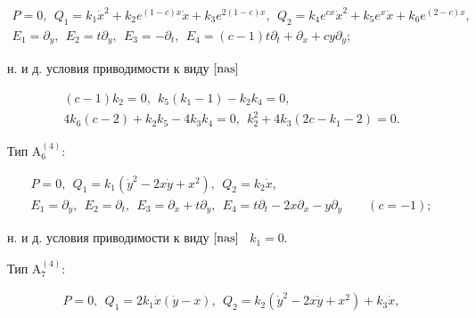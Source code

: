 \begin{thms}
\begin{gather*}


P=0,\ \ Q_1= k_1\Dot x^2+k_2e^{(1-c)x}\Dot x+k_3e^{2(1-c)x},\ \


Q_2= k_4e^{cx}\Dot x^2+k_5e^x\Dot x+k_6e^{(2-c)x}, \\


E_1=\partial_y,\ \ E_2=t\partial_ y,


\ \ E_3=-\partial_ t,\ \


E_4=(c-1)t\partial_t+\partial_x+cy\partial_y;


\end{gather*}


н. и д. условия приводимости к виду $\eqref{nas}$


\begin{gather*}


(c-1)k_2=0,\ \ k_5(k_1-1)-k_2k_4=0,\\


4k_6(c-2)+k_2k_5-4k_3k_4=0,\ \ 


k_2^2+4k_3(2c-k_1-2)=0.


\end{gather*}


 


Тип $\mathrm{A^{(4)}_6}{:}$


\begin{gather*}


P=0,\ \ Q_1= k_1(\Dot y^2-2x\Dot y+x^2),


\ \ Q_2= k_2\Dot x,\\


E_1=\partial_y,\ \ E_2=\partial_ t,\ \


E_3=\partial_ x+t\partial_ y,\ \


E_4=t\partial_t-2x\partial_x-y\partial_y\qquad (c=-1);


\end{gather*}


н. и д. условия приводимости к виду $\eqref{nas}$ \ $k_1=0$.





Тип $\mathrm{A^{(4)}_7}{:}$


\begin{gather*}


P=0,\ \ Q_1= 2{ k_1}{ \Dot x}({ \Dot y} - x),


\ \


Q_2={ k_2}({ \Dot y}^{2} - 2x{ \Dot y} + { x}^{2})+{ k_3}{\Dot x},\\



\end{gather*}
\end{thms}
